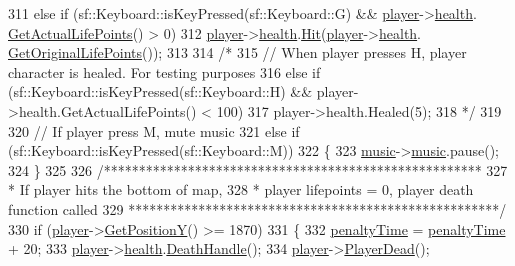 \begin{DoxyCode}
311     \textcolor{keywordflow}{else} \textcolor{keywordflow}{if} (sf::Keyboard::isKeyPressed(sf::Keyboard::G) && \hyperlink{classTestApp_a72c21fba56a65699606328b9e765d6db}{player}->\hyperlink{classPlayerObject_ad09efd50cf54cefed3250636a2fb1013}{health}.
      \hyperlink{classHealth_a6abce3e8a6eb4bd125c1a5da3afa791a}{GetActualLifePoints}() > 0)
312         \hyperlink{classTestApp_a72c21fba56a65699606328b9e765d6db}{player}->\hyperlink{classPlayerObject_ad09efd50cf54cefed3250636a2fb1013}{health}.\hyperlink{classHealth_a565eec980a98122472e88c57e43b9f16}{Hit}(\hyperlink{classTestApp_a72c21fba56a65699606328b9e765d6db}{player}->\hyperlink{classPlayerObject_ad09efd50cf54cefed3250636a2fb1013}{health}.
      \hyperlink{classHealth_a287e046c38875fc1db172318cb1ec291}{GetOriginalLifePoints}());
313 
314         \textcolor{comment}{/*}
315 \textcolor{comment}{        // When player presses H, player character is healed. For testing purposes}
316 \textcolor{comment}{    else if (sf::Keyboard::isKeyPressed(sf::Keyboard::H) && player->health.GetActualLifePoints() < 100)}
317 \textcolor{comment}{        player->health.Healed(5);}
318 \textcolor{comment}{         */}
319 
320         \textcolor{comment}{// If player press M, mute music}
321     \textcolor{keywordflow}{else} \textcolor{keywordflow}{if} (sf::Keyboard::isKeyPressed(sf::Keyboard::M))
322     \{
323         \hyperlink{classTestApp_a0aab55007364bd9b7c45a914feafd166}{music}->\hyperlink{classMusic_a5b300a70ca62ec94d0e41c71bc0f9e40}{music}.pause();
324     \}
325 
326     \textcolor{comment}{/******************************************************}
327 \textcolor{comment}{     * If player hits the bottom of map,}
328 \textcolor{comment}{     * player lifepoints = 0, player death function called}
329 \textcolor{comment}{     *****************************************************/}
330     \textcolor{keywordflow}{if} (\hyperlink{classTestApp_a72c21fba56a65699606328b9e765d6db}{player}->\hyperlink{classPlayerObject_ad17b9ec44299f4dc9ca20064c883496b}{GetPositionY}() >= 1870)
331     \{
332         \hyperlink{classTestApp_a51cfb72ed25d079befa8575019fed98d}{penaltyTime} = \hyperlink{classTestApp_a51cfb72ed25d079befa8575019fed98d}{penaltyTime} + 20;
333         \hyperlink{classTestApp_a72c21fba56a65699606328b9e765d6db}{player}->\hyperlink{classPlayerObject_ad09efd50cf54cefed3250636a2fb1013}{health}.\hyperlink{classHealth_a6a842c5b9cc3f68ffe17659ee9153cf2}{DeathHandle}();
334         \hyperlink{classTestApp_a72c21fba56a65699606328b9e765d6db}{player}->\hyperlink{classPlayerObject_a180ae1fcbd6b7eb4491cbf1f846b8b25}{PlayerDead}();

\end{DoxyCode}
